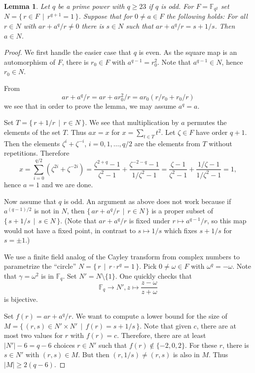 \documentclass[10pt,a4paper]{amsart}
\newtheorem{lemma}{Lemma}
\newcommand{\FF}{\mathbb F}
\newcommand{\abs}[1]{\lvert#1\rvert}
\newcommand*{\defset}[2]{\{\,#1\,\mid\,#2\,\}}
\newcommand*{\set}[1]{\{#1\}}
\begin{document}
\begin{lemma}
  Let $q$ be a prime power with $q\ge23$ if $q$ is odd. For
  $F=\FF_{q^2}$ set $N=\defset{r\in F}{r^{q+1}=1}$. Suppose that for
  $0\ne a\in F$ the following holds: For all $r\in N$ with
  $ar+a^q/r\ne0$ there is $s\in N$ such that $ar+a^q/r = s+1/s$. Then
  $a\in N$.
\end{lemma}

\begin{proof} We first handle the easier case that $q$ is even.
As the square map is an automorphism of $F$, there is $r_0\in F$ with
$a^{q-1}=r_0^2$. Note that $a^{q-1}\in N$, hence $r_0\in N$.
  
From%
\[
  ar+a^q/r=ar+ar_0^2/r=ar_0(r/r_0+r_0/r)
\]
  we see that in order to prove the lemma, we may assume $a^q=a$.

  Set $T=\defset{r+1/r}{r\in N}$. We see that multiplication by $a$
  permutes the elements of the set $T$. Thus $ax=x$ for
  $x=\sum_{t\in T}t^2$. Let $\zeta\in F$ have order $q+1$. Then the
  elements $\zeta^i+\zeta^{-i}$, $i=0,1,\dots,q/2$ are the elements
  from $T$ without repetitions. Therefore
  \[
    x = \sum_{i=0}^{q/2}(\zeta^{2i}+\zeta^{-2i})%
    =
    \frac{\zeta^{2+q}-1}{\zeta^2-1}+\frac{\zeta^{-2-q}-1}{1/\zeta^2-1}%
    =\frac{\zeta-1}{\zeta^2-1}+\frac{1/\zeta-1}{1/\zeta^2-1}=1,
  \]
  hence $a=1$ and we are done.

  Now assume that $q$ is odd. An argument as above does not work
  because if $a^{(q-1)/2}$ is not in $N$, then
  $\defset{ar+a^q/r}{r\in N}$ is a proper subset of
  $\defset{s+1/s}{s\in N}$. (Note that $ar+a^q/r$ is fixed under
  $r\mapsto a^{q-1}/r$, so this map would not have a fixed point, in
  contrast to $s\mapsto 1/s$ which fixes $s+1/s$ for $s=\pm1$.)

  We use a finite field analog of the Cayley transform from complex
  numbers to parametrize the ``circle'' $N=\defset{r}{r\cdot r^q=1}$.
  Pick $0\ne\omega\in F$ with $\omega^q=-\omega$. Note that
  $\gamma=\omega^2$ is in $\FF_q$. Set $N'=N\setminus\set{1}$. One
  quickly checks that
  \[
    \FF_q\to N', z\mapsto\frac{z-\omega}{z+\omega}
  \]
  is bijective.

  Set $f(r)=ar+a^q/r$. We want to compute a lower bound for the size
  of $M=\defset{(r,s)\in N'\times N'}{f(r)=s+1/s}$. Note that given
  $c$, there are at most two values for $r$ with $f(r)=c$. Therefore,
  there are at least $\abs{N'}-6=q-6$ choices $r\in N'$ such that
  $f(r)\notin\set{-2, 0, 2}$. For these $r$, there is $s\in N'$ with
  $(r, s)\in M$. But then $(r,1/s)\ne(r,s)$ is also in $M$. Thus
  $\abs{M}\ge2(q-6)$.


\end{proof}
\end{document}
